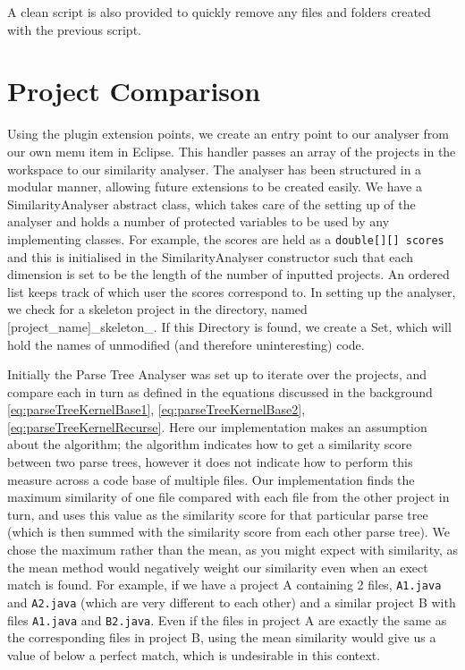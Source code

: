 A clean script is also provided to quickly remove any files and folders created with
the previous script.

\section{Project Comparison}

Using the plugin extension points,
we create an entry point to our analyser from our own menu item in Eclipse. This
handler passes an array of the projects in the workspace to our similarity analyser.
The analyser has been structured in a modular manner, allowing future extensions
to be created easily. We have a SimilarityAnalyser abstract class, which takes
care of the setting up of the analyser and holds a number of protected variables
to be used by any implementing classes. For example, the scores are held as a
\texttt{double[][] scores} and this is initialised in the SimilarityAnalyser
constructor such that each dimension is set to be the length of the number of
inputted projects. An ordered list keeps track of which user the scores correspond
to. In setting up the analyser, we check for a skeleton project in the directory,
named [project\_name]\_skeleton\_. If this Directory is found, we create a Set,
which will hold the names of unmodified (and therefore uninteresting) code.

Initially the Parse Tree Analyser was set up to iterate over the projects, and
compare each in turn as defined in the equations discussed in the background 
\cref{eq:parseTreeKernelBase1}, \cref{eq:parseTreeKernelBase2},
\cref{eq:parseTreeKernelRecurse}. Here our implementation makes an assumption about
the algorithm; the algorithm indicates how to get a similarity score between two 
parse trees, however it does not indicate how to perform this measure across a code
base of multiple files. Our implementation finds the maximum similarity of one file
compared with each file from the other project in turn, and uses this value as the
similarity score for that particular parse tree (which is then summed with the similarity
score from each other parse tree). We chose the maximum rather than the mean, as
you might expect with similarity, as the mean method would negatively weight our
similarity even when an exect match is found. For example, if we have a project A
containing 2 files, \texttt{A1.java} and \texttt{A2.java} (which are very different
to each other) and a similar project B with files \texttt{A1.java} and \texttt{B2.java}.
Even if the files in project A are exactly the same as the corresponding files in
project B, using the mean similarity would give us a value of below a perfect match,
which is undesirable in this context.


